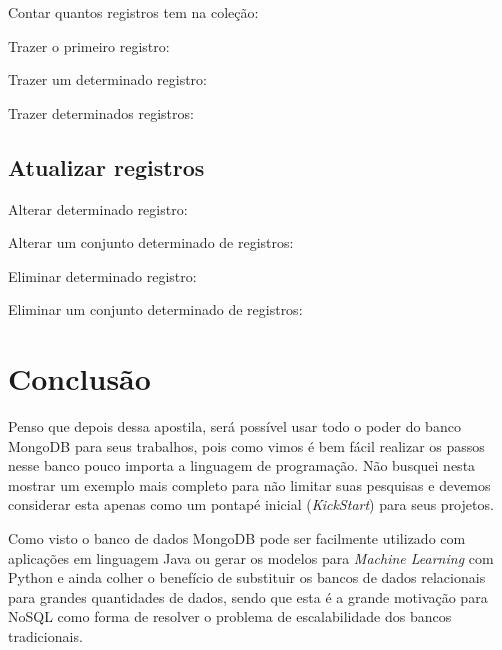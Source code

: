 \documentclass[a4paper,11pt]{article}
\begin{document}
Contar quantos registros tem na coleção: \\

Trazer o primeiro registro: \\

Trazer um determinado registro: \\

Trazer determinados registros: \\

\subsection{Atualizar registros}
Alterar determinado registro: \\

Alterar um conjunto determinado de registros: \\

Eliminar determinado registro: \\

Eliminar um conjunto determinado de registros: \\

\section{Conclusão}
Penso que depois dessa apostila, será possível usar todo o poder do banco MongoDB para seus trabalhos, pois como vimos é bem fácil realizar os passos nesse banco pouco importa a linguagem de programação. Não busquei nesta mostrar um exemplo mais completo para não limitar suas pesquisas e devemos considerar esta apenas como um pontapé inicial (\textit{KickStart}) para seus projetos.

Como visto o banco de dados MongoDB pode ser facilmente utilizado com aplicações em linguagem Java ou gerar os modelos para \textit{Machine Learning} com Python e ainda colher o benefício de substituir os bancos de dados relacionais para grandes quantidades de dados, sendo que esta é a grande motivação para NoSQL como forma de resolver o problema de escalabilidade dos bancos tradicionais.
\end{document}
